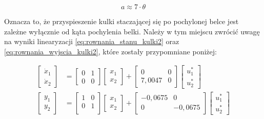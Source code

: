 \begin{equation}
    a \approx 7 \cdot \theta \label{eq:przyspieszenie_kulki3}
\end{equation}

Oznacza to, że przyspieszenie kulki staczającej się po pochylonej belce jest zależne wyłącznie od kąta pochylenia belki. Należy w tym miejscu zwrócić uwagę na wyniki linearyzacji \eqref{eq:rownania_stanu_kulki2} oraz \eqref{eq:rownania_wyjscia_kulki2}, które zostały przypomniane poniżej:

\begin{align*}
    \begin{bmatrix}
        \dot{x}_1 \\ \dot{x}_2
    \end{bmatrix}
    &= \begin{bmatrix}
        0 & 1 \\
        0 & 0
    \end{bmatrix}
    \begin{bmatrix}
        x_1 \\ x_2
    \end{bmatrix}
    +
    \begin{bmatrix}
        0 & 0 \\ 7,0047 & 0
    \end{bmatrix}
    \begin{bmatrix}
        u_1^* \\ u_2^*
    \end{bmatrix}\\
    \begin{bmatrix}
        y_1 \\ y_2
    \end{bmatrix}
    &= \begin{bmatrix}
        1 & 0 \\
        0 & 1 \\
    \end{bmatrix}
    \begin{bmatrix}
        x_1 \\ x_2
    \end{bmatrix}
    + \begin{bmatrix}
        -0,0675 & 0 \\
        0 & -0,0675
    \end{bmatrix}
    \begin{bmatrix}
        u_1^* \\ u_2^*
    \end{bmatrix}
\end{align*}

